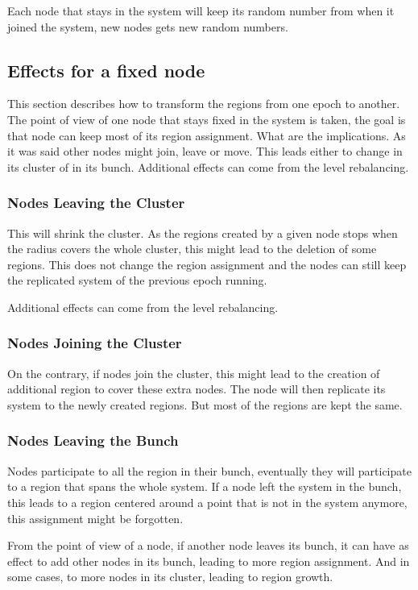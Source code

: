 \documentclass[a4paper,11pt,oneside]{report}
\begin{document}
Each node that stays in the system will keep its random number from when it
joined the system, new nodes gets new random numbers. 

\subsection{Effects for a fixed node} This section describes how to transform
the regions from one epoch to another.  The point of view of one node that
stays fixed in the system is taken, the goal is that node can keep most of its
region assignment.  What are the implications. As it was said other nodes might
join, leave or move. This leads either to change in its cluster of in its
bunch. 
Additional effects can come from the level rebalancing. 

\subsubsection{Nodes Leaving the Cluster} 
This will shrink the cluster. As the regions created by a given node stops when
the radius covers the whole cluster, this might lead to the deletion of some
regions. This does not change the
region assignment and the nodes can still keep the replicated system of the
previous epoch running.

Additional effects can come from the level rebalancing. 

\subsubsection{Nodes Joining the Cluster} 
On the contrary, if nodes join the cluster, this might lead to the creation of
additional region to cover these extra nodes. The node will then replicate its
system to the newly created regions. But most of the regions are kept the same.

\subsubsection{Nodes Leaving the Bunch} 
Nodes participate to all the region in their bunch, eventually they will
participate to a region that spans the whole system. If a node left the system
in the bunch,  this leads to a region centered around a point that is not in
the system anymore, this assignment might be forgotten. 

From the point of view of a node, if another node leaves its bunch, it can have
as effect to add other nodes in its bunch, leading to more region assignment.
And in some cases, to more nodes in its cluster, leading to region growth. 
\end{document}
